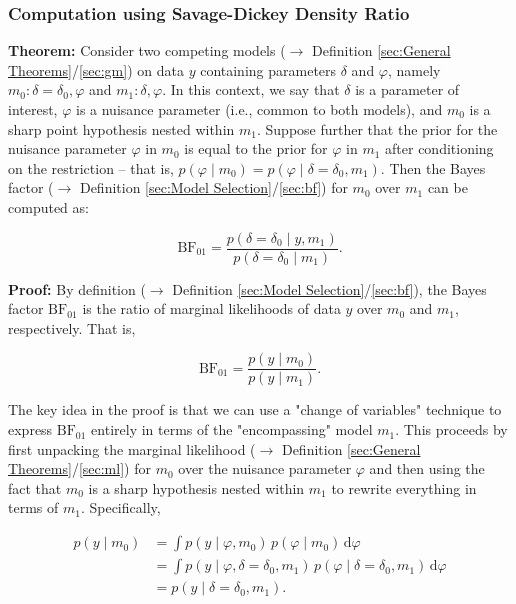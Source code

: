 \documentclass[a4paper,12pt,twoside]{book}
\begin{document}
\subsubsection[\textbf{Computation using Savage-Dickey Density Ratio}]{Computation using Savage-Dickey Density Ratio} \label{sec:bf-sddr}
\setcounter{equation}{0}

\textbf{Theorem:} Consider two competing models ($\rightarrow$ Definition \ref{sec:General Theorems}/\ref{sec:gm}) on data $y$ containing parameters $\delta$ and $\varphi$, namely $m_0:\delta=\delta_0,\varphi$ and $m_1:\delta,\varphi$. In this context, we say that $\delta$ is a parameter of interest, $\varphi$ is a nuisance parameter (i.e., common to both models), and $m_0$ is a sharp point hypothesis nested within $m_1$. Suppose further that the prior for the nuisance parameter $\varphi$ in $m_0$ is equal to the prior for $\varphi$ in $m_1$ after conditioning on the restriction -- that is, $p(\varphi\mid m_0) = p(\varphi\mid \delta=\delta_0,m_1)$. Then the Bayes factor ($\rightarrow$ Definition \ref{sec:Model Selection}/\ref{sec:bf}) for $m_0$ over $m_1$ can be computed as:

\begin{equation} \label{eq:bf-sddr-sd}
\text{BF}_{01} = \frac{p(\delta=\delta_0\mid y,m_1)}{p(\delta=\delta_0\mid m_1)}.
\end{equation}

\vspace{1em}
\textbf{Proof:} By definition ($\rightarrow$ Definition \ref{sec:Model Selection}/\ref{sec:bf}), the Bayes factor $\text{BF}_{01}$ is the ratio of marginal likelihoods of data $y$ over $m_0$ and $m_1$, respectively. That is,

\begin{equation} \label{eq:bf-sddr-bf}
\text{BF}_{01}=\frac{p(y \mid m_0)}{p(y \mid m_1)}.
\end{equation}

The key idea in the proof is that we can use a "change of variables" technique to express $\text{BF}_{01}$ entirely in terms of the "encompassing" model $m_1$. This proceeds by first unpacking the marginal likelihood ($\rightarrow$ Definition \ref{sec:General Theorems}/\ref{sec:ml}) for $m_0$ over the nuisance parameter $\varphi$ and then using the fact that $m_0$ is a sharp hypothesis nested within $m_1$ to rewrite everything in terms of $m_1$. Specifically,

\begin{equation} \label{eq:bf-sddr-ml-m0}
\begin{split}
 p(y \mid m_0) &= \int p(y \mid \varphi,m_0) \, p(\varphi\mid m_0) \, \mathrm{d} \varphi \\
  &= \int p(y \mid \varphi,\delta=\delta_0,m_1) \, p(\varphi\mid \delta=\delta_0,m_1) \, \mathrm{d} \varphi \\
  &= p(y \mid \delta=\delta_0,m_1).\\
\end{split}
\end{equation}
\end{document}
